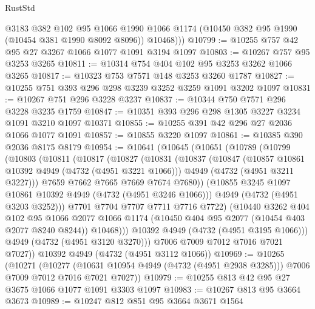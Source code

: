 \begin{lexlean}{RustStd}
\begin{coremodule}
{\begin{coremodule}
{{{{{{{{{{{{{{          @3183
          @382
          @102
          @95
          @1066
          @1990
          @1066
          @1174
          (@10450 @382 @95 @1990 (@10454 @381 @1990 @8092 @8096))
          @10468)))
@10799 := @10255 @757 @42 @95 @27 @3267 @1066 @1077 @1091 @3194 @1097
@10803 := @10267 @757 @95 @3253 @3265
@10811 := @10314 @754 @404 @102 @95 @3253 @3262 @1066 @3265
@10817 := @10323 @753 @7571 @148 @3253 @3260 @1787
@10827 := @10255 @751 @393 @296 @298 @3239 @3252 @3259 @1091 @3202 @1097
@10831 := @10267 @751 @296 @3228 @3237
@10837 := @10344 @750 @7571 @296 @3228 @3235 @1759
@10847 := @10351 @393 @296 @298 @1305 @3227 @3234 @1091 @3210 @1097 @10371
@10855 := @10255 @391 @42 @296 @27 @2036 @1066 @1077 @1091
@10857 := @10855 @3220 @1097
@10861 := @10385 @390 @2036 @8175 @8179
@10954 := @10641
    (@10645
      (@10651
        (@10789
          (@10799
            (@10803
              (@10811
                (@10817
                  (@10827
                    (@10831
                      (@10837
                        (@10847
                          (@10857 @10861 @10392 @4949 (@4732 (@4951 @3221 @1066)))
                          @4949
                          (@4732 (@4951 @3211 @3227)))
                        @7659
                        @7662
                        @7665
                        @7669
                        @7674
                        @7680))
                    (@10855 @3245 @1097 @10861 @10392 @4949 (@4732 (@4951 @3246 @1066)))
                    @4949
                    (@4732 (@4951 @3203 @3252)))
                  @7701
                  @7704
                  @7707
                  @7711
                  @7716
                  @7722)
                (@10440
                  @3262
                  @404
                  @102
                  @95
                  @1066
                  @2077
                  @1066
                  @1174
                  (@10450 @404 @95 @2077 (@10454 @403 @2077 @8240 @8244))
                  @10468)))
            @10392
            @4949
            (@4732 (@4951 @3195 @1066)))
          @4949
          (@4732 (@4951 @3120 @3270)))
        @7006
        @7009
        @7012
        @7016
        @7021
        @7027))
    @10392
    @4949
    (@4732 (@4951 @3112 @1066))
@10969 := @10265
    (@10271
      (@10277
        (@10631 @10954 @4949 (@4732 (@4951 @2938 @3285)))
        @7006
        @7009
        @7012
        @7016
        @7021
        @7027))
@10979 := @10255 @813 @42 @95 @27 @3675 @1066 @1077 @1091 @3303 @1097
@10983 := @10267 @813 @95 @3664 @3673
@10989 := @10247 @812 @851 @95 @3664 @3671 @1564
}}}}}}}}}}}}}}
\end{coremodule}}
\end{coremodule}
\end{lexlean}
